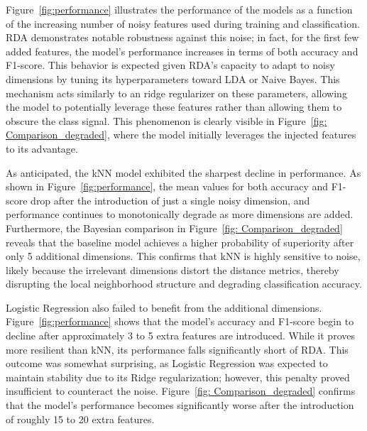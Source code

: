 \documentclass[11pt]{article}
\begin{document}
Figure~\ref{fig:performance} illustrates the performance of the models as a function of the increasing number of noisy features used during training and classification. RDA demonstrates notable robustness against this noise; in fact, for the first few added features, the model's performance increases in terms of both accuracy and F1-score. This behavior is expected given RDA's capacity to adapt to noisy dimensions by tuning its hyperparameters toward LDA or Naive Bayes. This mechanism acts similarly to an ridge regularizer on these parameters, allowing the model to potentially leverage these features rather than allowing them to obscure the class signal. This phenomenon is clearly visible in Figure~\ref{fig: Comparison_degraded}, where the model initially leverages the injected features to its advantage.

As anticipated, the kNN model exhibited the sharpest decline in performance. As shown in Figure~\ref{fig:performance}, the mean values for both accuracy and F1-score drop after the introduction of just a single noisy dimension, and performance continues to monotonically degrade as more dimensions are added. Furthermore, the Bayesian comparison in Figure~\ref{fig: Comparison_degraded} reveals that the baseline model achieves a higher probability of superiority after only 5 additional dimensions. This confirms that kNN is highly sensitive to noise, likely because the irrelevant dimensions distort the distance metrics, thereby disrupting the local neighborhood structure and degrading classification accuracy.

Logistic Regression also failed to benefit from the additional dimensions. Figure~\ref{fig:performance} shows that the model's accuracy and F1-score begin to decline after approximately 3 to 5 extra features are introduced. While it proves more resilient than kNN, its performance falls significantly short of RDA. This outcome was somewhat surprising, as Logistic Regression was expected to maintain stability due to its Ridge regularization; however, this penalty proved insufficient to counteract the noise. Figure~\ref{fig: Comparison_degraded} confirms that the model's performance becomes significantly worse after the introduction of roughly 15 to 20 extra features.

\newpage
\end{document}
